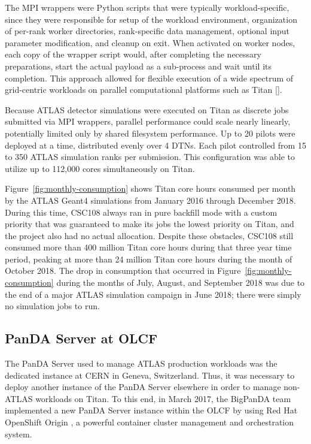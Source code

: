The MPI wrappers were Python scripts that were typically workload-specific,
since they were responsible for setup of the workload environment, organization
of per-rank worker directories, rank-specific data management, optional input
parameter modification, and cleanup on exit. When activated on worker nodes,
each copy of the wrapper script would, after completing the necessary
preparations, start the actual payload as a sub-process and wait until its
completion. This approach allowed for flexible execution of a wide spectrum of
grid-centric workloads on parallel computational platforms such as Titan
\ref{}. 

Because ATLAS detector simulations were executed on Titan as discrete jobs
submitted via MPI wrappers, parallel performance could scale nearly linearly,
potentially limited only by shared filesystem performance. Up to 20 pilots were
deployed at a time, distributed evenly over 4 DTNs. Each pilot controlled from
15 to 350 ATLAS simulation ranks per submission. This configuration was able to
utilize up to 112,000 cores simultaneously on Titan.

Figure~\ref{fig:monthly-consumption} shows Titan core hours consumed per month
by the ATLAS Geant4 simulations from January 2016 through December 2018. During
this time, CSC108 always ran in pure backfill mode with a custom priority that
was guaranteed to make its jobs the lowest priority on Titan, and the project
also had no actual allocation. Despite these obstacles, CSC108 still consumed
more than 400 million Titan core hours during that three year time period,
peaking at more than 24 million Titan core hours during the month of October
2018. The drop in consumption that occurred in
Figure~\ref{fig:monthly-consumption} during the months of July, August, and
September 2018 was due to the end of a major ATLAS simulation campaign in June
2018; there were simply no simulation jobs to run.

\subsection{PanDA Server at OLCF}
\label{subsec:panda_instance}

The PanDA Server used to manage ATLAS production workloads was the dedicated
instance at CERN in Geneva, Switzerland. Thus, it was necessary to deploy
another instance of the PanDA Server elsewhere in order to manage non-ATLAS
workloads on Titan. To this end, in March 2017, the BigPanDA team implemented a
new PanDA Server instance within the OLCF by using Red Hat OpenShift Origin
\cite{RH_OpenShift}, a powerful container cluster management and orchestration
system.

